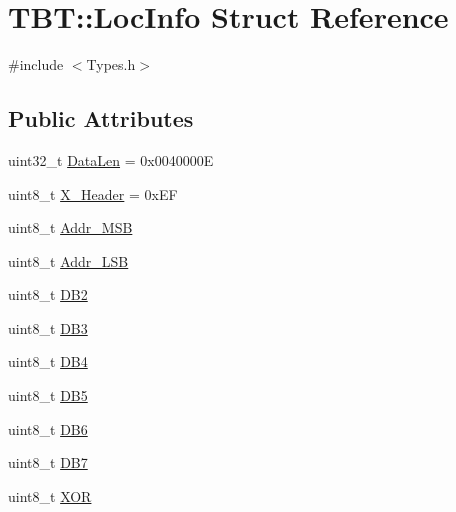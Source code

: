 \hypertarget{structTBT_1_1LocInfo}{}\section{T\+BT\+:\+:Loc\+Info Struct Reference}
\label{structTBT_1_1LocInfo}


{\ttfamily \#include $<$Types.\+h$>$}

\subsection*{Public Attributes}
\begin{DoxyCompactItemize}
\item 
uint32\+\_\+t \hyperlink{structTBT_1_1LocInfo_a0d8fe6578172ef468f3efdd101cf9529_a0d8fe6578172ef468f3efdd101cf9529}{Data\+Len} = 0x0040000E
\item 
uint8\+\_\+t \hyperlink{structTBT_1_1LocInfo_a89133f4810d6228a3f918352c03eb922_a89133f4810d6228a3f918352c03eb922}{X\+\_\+\+Header} = 0x\+EF
\item 
uint8\+\_\+t \hyperlink{structTBT_1_1LocInfo_a3283b821238bcfc7b9c5a6f126dbe8ff_a3283b821238bcfc7b9c5a6f126dbe8ff}{Addr\+\_\+\+M\+SB}
\item 
uint8\+\_\+t \hyperlink{structTBT_1_1LocInfo_afcda6186c86f12fee9f0907c667ba2c1_afcda6186c86f12fee9f0907c667ba2c1}{Addr\+\_\+\+L\+SB}
\item 
uint8\+\_\+t \hyperlink{structTBT_1_1LocInfo_a3afd371cc25c979fac7ac0af9f1ad48a_a3afd371cc25c979fac7ac0af9f1ad48a}{D\+B2}
\item 
uint8\+\_\+t \hyperlink{structTBT_1_1LocInfo_aa2e76b63a3657b7fe1bf602186a416fa_aa2e76b63a3657b7fe1bf602186a416fa}{D\+B3}
\item 
uint8\+\_\+t \hyperlink{structTBT_1_1LocInfo_aa6b13fcc4b2b02ba839f91bb78e37b50_aa6b13fcc4b2b02ba839f91bb78e37b50}{D\+B4}
\item 
uint8\+\_\+t \hyperlink{structTBT_1_1LocInfo_ae9425a4b329dc1f773042737212fa49c_ae9425a4b329dc1f773042737212fa49c}{D\+B5}
\item 
uint8\+\_\+t \hyperlink{structTBT_1_1LocInfo_acceeedfb63ab970403ce8b75b611f59f_acceeedfb63ab970403ce8b75b611f59f}{D\+B6}
\item 
uint8\+\_\+t \hyperlink{structTBT_1_1LocInfo_ada6908e13b58140fe9a127de250f893e_ada6908e13b58140fe9a127de250f893e}{D\+B7}
\item 
uint8\+\_\+t \hyperlink{structTBT_1_1LocInfo_a291c95e946ab6a1390523590bdeb7722_a291c95e946ab6a1390523590bdeb7722}{X\+OR}
\end{DoxyCompactItemize}



